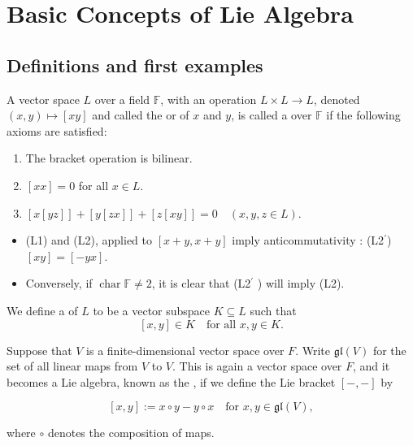 \documentclass[../main.tex]{subfiles}
\begin{document}
\ifSubfilesClassLoaded{

    \tableofcontents
    
}{}

\chapter{ Basic Concepts of Lie Algebra }

\section{Definitions and first examples}

\begin{definition}{}{}
A vector space $L$ over a field $\mathbb{F}$, with an operation $L \times L \to L$, denoted $(x, y) \mapsto [xy]$ and called the  or  of $x$ and $y$, is called a  over $\mathbb{F}$ if the following axioms are satisfied:
\begin{enumerate}
\item[(L1)] The bracket operation is bilinear.
\item[(L2)] $[xx] = 0$ for all $x \in L$.
\item[(L3)] $[x[yz]]+[y[zx]]+[z[xy]] = 0 \quad (x, y, z \in L)$.
\end{enumerate}
\end{definition}

\begin{remark}
   \begin{itemize}
    \item  (L1) and (L2), applied to \(  \left[ x+ y, x+ y \right]   \) imply anticommutativity : (L2\(  ^{\prime}   \)) \(  \left[ xy \right]= \left[ -yx \right]    \). 
    \item Conversely, if \(  \operatorname{char}\mathbb{F}\neq 2  \), it is clear that (L2\(  ^{\prime}   \) ) will imply (L2). 
   \end{itemize}
     
\end{remark}

\begin{definition}{}{}
   We  define a  of $L$ to be a vector subspace $K \subseteq L$ such that
$$[x, y] \in K \quad \text{for all } x, y \in K.$$
\end{definition}

\begin{example}{}{}
   Suppose that $V$ is a finite-dimensional vector space over $F$. Write $\mathfrak{gl}(V)$ for the set of all linear maps from $V$ to $V$. This is again a vector space over $F$, and it becomes a Lie algebra, known as the , if we define the Lie bracket $[-,-]$ by

\[
[x,y] := x \circ y - y \circ x \quad \text{for } x, y \in \mathfrak{gl}(V),
\]

where $\circ$ denotes the composition of maps.
\end{example}
\end{document}
